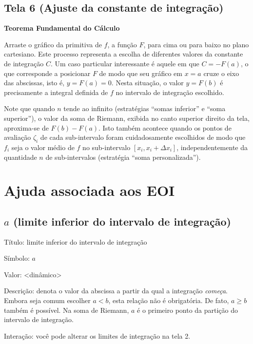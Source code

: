 \documentclass[a4paper,10pt]{scrartcl}
\begin{document}
  \subsection*{Tela 6 (Ajuste da constante de integração)}
    \textbf{Teorema Fundamental do Cálculo}
    
    Arraste o gráfico da primitiva de $f$, a função $F$, para cima ou para baixo no plano cartesiano. Este processo representa a escolha de diferentes valores da constante de integração $C$. Um caso particular interessante é aquele em que $C = -F(a)$, o que corresponde a posicionar $F$ de modo que seu gráfico em $x = a$ cruze o eixo das abscissas, isto é, $y = F(a) = 0$. Nesta situação, o valor $y = F(b)$ é precisamente a integral definida de $f$ no intervalo de integração escolhido.
    
    Note que quando $n$ tende ao infinito (estratégias ``somas inferior'' e ``soma superior''), o valor da soma de Riemann, exibida no canto superior direito da tela, aproxima-se de $F(b)-F(a)$. Isto também acontece quando os pontos de avaliação $\zeta_i$ de cada sub-intervalo foram cuidadosamente escolhidos de modo que $f_i$ seja o valor médio de $f$ no sub-intervalo $[x_i,x_i+\Delta x_i]$, independentemente da quantidade $n$ de sub-intervalos (estratégia ``soma personalizada'').

  \section*{Ajuda associada aos EOI}

  \subsection*{$a$ (limite inferior do intervalo de integração)}
    \begin{compactdesc}
      \item{Título:} limite inferior do intervalo de integração
      \item{Símbolo:} $a$
      \item{Valor:} <dinâmico>
      \item{Descrição:} denota o valor da abscissa a partir da qual a integração \emph{começa}. Embora seja comum escolher $a < b$, esta relação não é obrigatória. De fato, $a \ge b$ também é possível. Na soma de Riemann, $a$ é o primeiro ponto da partição do intervalo de integração.
      \item{Interação:} você pode alterar os limites de integração na tela 2.
    \end{compactdesc}
\end{document}
